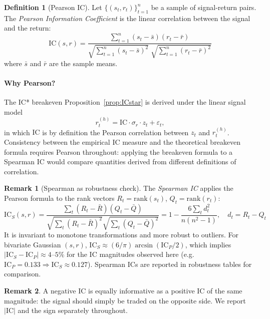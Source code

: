 \documentclass[12pt, a4paper]{article}
\theoremstyle{plain}
\theoremstyle{definition}
\newtheorem{definition}{Definition}[section]
\newtheorem{remark}{Remark}[section]
\newcommand{\IC}{\mathrm{IC}}
\newcommand{\rank}{\mathrm{rank}}
\begin{document}
\begin{definition}[Pearson IC]
  Let $\{(s_t, r_t)\}_{t=1}^n$ be a sample of signal-return pairs.
  The \emph{Pearson Information Coefficient} is the linear correlation
  between the signal and the return:
  \begin{equation}
    \IC(s, r) = \frac{\displaystyle\sum_{t=1}^n (s_t - \bar{s})(r_t - \bar{r})}
                     {\displaystyle\sqrt{\sum_{t=1}^n (s_t - \bar{s})^2}\;
                      \sqrt{\sum_{t=1}^n (r_t - \bar{r})^2}}
    \label{eq:pearson_ic}
  \end{equation}
  where $\bar{s}$ and $\bar{r}$ are the sample means.
\end{definition}

\paragraph{Why Pearson?}
The IC* breakeven Proposition~\ref{prop:ICstar} is derived under the
linear signal model
\[
  r_t^{(h)} = \IC \cdot \sigma_r \cdot z_t + \varepsilon_t,
\]
in which $\IC$ is by definition the Pearson correlation between $z_t$ and
$r_t^{(h)}$.  Consistency between the empirical IC measure and the
theoretical breakeven formula requires Pearson throughout: applying
the breakeven formula to a Spearman IC would compare quantities derived
from different definitions of correlation.

\begin{remark}[Spearman as robustness check]
  The \emph{Spearman IC} applies the Pearson formula to the rank vectors
  $R_t = \rank(s_t)$, $Q_t = \rank(r_t)$:
  \[
    \IC_S(s, r) = \frac{\sum_t (R_t - \bar{R})(Q_t - \bar{Q})}
                       {\sqrt{\sum_t (R_t - \bar{R})^2}
                        \sqrt{\sum_t (Q_t - \bar{Q})^2}}
    = 1 - \frac{6\sum_t d_t^2}{n(n^2-1)}, \quad d_t = R_t - Q_t
  \]
  It is invariant to monotone transformations and more robust to outliers.
  For bivariate Gaussian $(s,r)$,
  $\IC_S \approx (6/\pi)\arcsin(\IC_P/2)$,
  which implies $|\IC_S - \IC_P| \approx 4$--$5\%$ for the IC magnitudes
  observed here (e.g.\ $\IC_P = 0.133 \Rightarrow \IC_S \approx 0.127$).
  Spearman ICs are reported in robustness tables for comparison.
\end{remark}

\begin{remark}
  A negative IC is equally informative as a positive IC of the same magnitude:
  the signal should simply be traded on the opposite side. We report
  $|\IC|$ and the sign separately throughout.
\end{remark}
\end{document}
